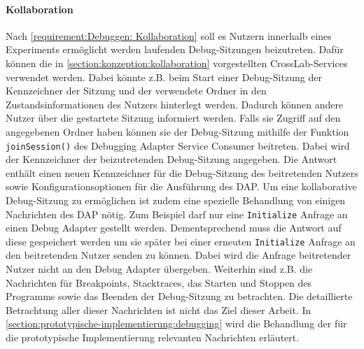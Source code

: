 \paragraph{Kollaboration} Nach \autoref{requirement:Debuggen: Kollaboration} soll es Nutzern innerhalb eines Experiments ermöglicht werden laufenden Debug-Sitzungen beizutreten. Dafür können die in \autoref{section:konzeption:kollaboration} vorgestellten CrossLab-Services verwendet werden. Dabei könnte z.B. beim Start einer Debug-Sitzung der Kennzeichner der Sitzung und der verwendete Ordner in den Zustandsinformationen des Nutzers hinterlegt werden. Dadurch können andere Nutzer über die gestartete Sitzung informiert werden. Falls sie Zugriff auf den angegebenen Ordner haben können sie der Debug-Sitzung mithilfe der Funktion \texttt{joinSession()} des Debugging Adapter Service Consumer beitreten. Dabei wird der Kennzeichner der beizutretenden Debug-Sitzung angegeben. Die Antwort enthält einen neuen Kennzeichner für die Debug-Sitzung des beitretenden Nutzers sowie Konfigurationsoptionen für die Ausführung des \ac{DAP}. Um eine kollaborative Debug-Sitzung zu ermöglichen ist zudem eine spezielle Behandlung von einigen Nachrichten des \ac{DAP} nötig. Zum Beispiel darf nur eine \texttt{Initialize} Anfrage an einen Debug Adapter gestellt werden. Dementsprechend muss die Antwort auf diese gespeichert werden um sie später bei einer erneuten \texttt{Initialize} Anfrage an den beitretenden Nutzer senden zu können. Dabei wird die Anfrage beitretender Nutzer nicht an den Debug Adapter übergeben. Weiterhin sind z.B. die Nachrichten für Breakpoints, Stacktraces, das Starten und Stoppen des Programms sowie das Beenden der Debug-Sitzung zu betrachten. Die detaillierte Betrachtung aller dieser Nachrichten ist nicht das Ziel dieser Arbeit. In \autoref{section:prototypische-implementierung:debugging} wird die Behandlung der für die prototypische Implementierung relevanten Nachrichten erläutert.